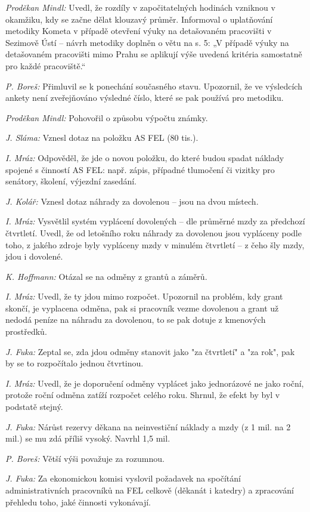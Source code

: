 \documentclass[a4paper,12pt,notitlepage,oneside]{article}
\begin{document}
\textit{Proděkan Mindl:} Uvedl, že rozdíly v započitatelných hodinách vzniknou v okamžiku, kdy se začne dělat klouzavý průměr. Informoval o uplatňování metodiky Kometa v případě otevření výuky na detašovaném pracovišti v Sezimově Ústí – návrh metodiky doplněn o větu na s. 5: „V případě výuky na detašovaném pracovišti mimo Prahu se aplikují výše uvedená kritéria samostatně pro každé pracoviště.“

\textit{P. Boreš:} Přimluvil se k ponechání současného stavu. Upozornil, že ve výsledcích ankety není zveřejňováno výsledné číslo, které se pak používá pro metodiku.

\textit{Proděkan Mindl:} Pohovořil o způsobu výpočtu známky.

\textit{J. Sláma:} Vznesl dotaz na položku AS FEL (80 tis.).

\textit{I. Mráz:} Odpověděl, že jde o novou položku, do které budou spadat náklady spojené s činností AS FEL: např. zápis, případné tlumočení či vizitky pro senátory, školení, výjezdní zasedání.

\textit{J. Kolář:} Vznesl dotaz náhrady za dovolenou – jsou na dvou místech.

\textit{I. Mráz:} Vysvětlil systém vyplácení dovolených – dle průměrné mzdy za předchozí čtvrtletí. Uvedl, že od letošního roku náhrady za dovolenou jsou vypláceny podle toho, z jakého zdroje byly vypláceny mzdy v minulém čtvrtletí – z čeho šly mzdy, jdou i dovolené.

\textit{K. Hoffmann:} Otázal se na odměny z grantů a záměrů.

\textit{I. Mráz:} Uvedl, že ty jdou mimo rozpočet. Upozornil na problém, kdy grant skončí, je vyplacena odměna, pak si pracovník vezme dovolenou a grant už nedodá peníze na náhradu za dovolenou, to se pak dotuje z kmenových prostředků.

\textit{J. Fuka:} Zeptal se, zda jdou odměny stanovit jako "za čtvrtletí" a "za rok", pak by se to rozpočítalo jednou čtvrtinou.

\textit{I. Mráz:} Uvedl, že je doporučení odměny vyplácet jako jednorázové ne jako roční, protože roční odměna zatíží rozpočet celého roku. Shrnul, že efekt by byl v podstatě stejný.

\textit{J. Fuka:} Nárůst rezervy děkana na neinvestiční náklady a mzdy (z 1 mil. na 2 mil.) se mu zdá příliš vysoký. Navrhl 1,5 mil.

\textit{P. Boreš:} Větší výši považuje za rozumnou.

\textit{J. Fuka:} Za ekonomickou komisi vyslovil požadavek na spočítání administrativních pracovníků na FEL celkově (děkanát i katedry) a zpracování přehledu toho, jaké činnosti vykonávají.
\end{document}
